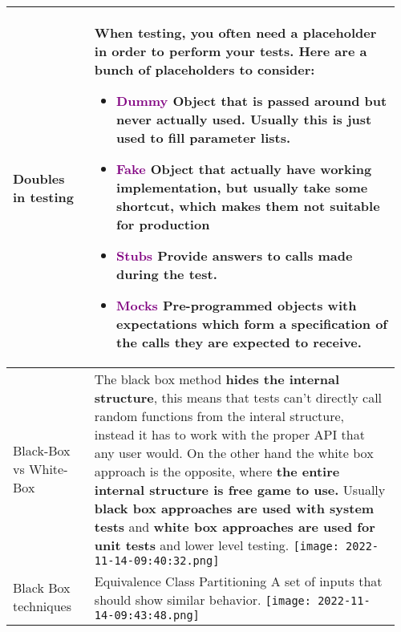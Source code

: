 \documentclass[main.tex,fontsize=8pt,paper=a4,paper=portrait,DIV=calc,]{scrartcl}
\begin{document}
\begin{table}[ht!]
\begin{tabular}{|m{0.2\linewidth}|m{0.755\linewidth}|}
\hline
Doubles in testing & 
When testing, you often need a placeholder in order to perform your tests.\newline
Here are a bunch of placeholders to consider:\newline
\begin{itemize}
\item \textcolor{purple}{Dummy}\newline
  Object that is passed around but never actually used.\newline
  Usually this is just used to fill parameter lists.
\item \textcolor{purple}{Fake}\newline
  Object that actually have working implementation, but usually take some shortcut,\newline
  which makes them not suitable for production
\item \textcolor{purple}{Stubs}\newline
  Provide answers to calls made during the test.
\item \textcolor{purple}{Mocks}\newline
  Pre-programmed objects with expectations which form a specification of the calls they are expected to receive.
\vspace{-3mm}
\end{itemize} \\
\hline
Black-Box vs White-Box & 
The black box method \textbf{hides the internal structure}, this means that tests can't directly call random functions from the interal structure, instead it has to work with the proper API that any user would.\newline
On the other hand the white box approach is the opposite, where \textbf{the entire internal structure is free game to use.}\newline
Usually \textbf{black box approaches are used with system tests} and \textbf{white box approaches are used for unit tests} and lower level testing.\newline
\texttt{[image: 2022-11-14-09:40:32.png]}\\
\hline
Black Box techniques & 
\textcolor{OliveGreen}{Equivalence Class Partitioning}\newline
A set of inputs that should show similar behavior.\newline
\texttt{[image: 2022-11-14-09:43:48.png]}\newline

\end{tabular}
\end{table}
\end{document}
